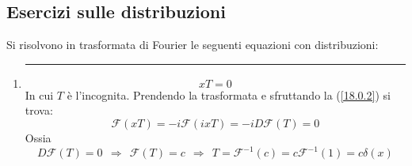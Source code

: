 \documentclass[twoside]{article}
\begin{document}
\subsection{Esercizi sulle distribuzioni}

Si risolvono in trasformata di Fourier le seguenti equazioni con distribuzioni:

\begin{enumerate}
    \item 
    \rule{\textwidth}{0.7 pt}
    \begin{equation}
        xT=0
    \end{equation}
    In cui $T$ è l'incognita. Prendendo la trasformata e sfruttando la (\ref{18.0.2}) si trova:
    \begin{equation}
        \mathcal{F}(xT)=-i\mathcal{F}(ixT)=-iD\mathcal{F}(T)=0
    \end{equation}
    Ossia
    \begin{equation}
        D\mathcal{F}(T)=0 \ \ \Rightarrow \ \ \mathcal{F}(T)=c \ \ \Rightarrow \ \ T=\mathcal{F}^{-1}(c)=c\mathcal{F}^{-1}(1)=c\delta(x)
    \end{equation}
    

\end{enumerate}
\end{document}
